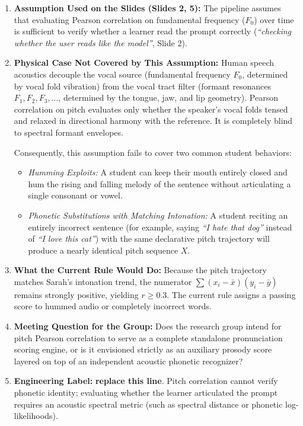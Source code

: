 \documentclass[11pt,a4paper]{article}
\begin{document}
\begin{enumerate}
    \item \textbf{Assumption Used on the Slides (Slides 2, 5):} The pipeline assumes that evaluating Pearson correlation on fundamental frequency ($F_0$) over time is sufficient to verify whether a learner read the prompt correctly (\textit{``checking whether the user reads like the model''}, Slide 2).
    \item \textbf{Physical Case Not Covered by This Assumption:} Human speech acoustics decouple the vocal source (fundamental frequency $F_0$, determined by vocal fold vibration) from the vocal tract filter (formant resonances $F_1, F_2, F_3, \dots$, determined by the tongue, jaw, and lip geometry). Pearson correlation on pitch evaluates only whether the speaker's vocal folds tensed and relaxed in directional harmony with the reference. It is completely blind to spectral formant envelopes. 
    
    Consequently, this assumption fails to cover two common student behaviors:
    \begin{itemize}
        \item \textit{Humming Exploits:} A student can keep their mouth entirely closed and hum the rising and falling melody of the sentence without articulating a single consonant or vowel.
        \item \textit{Phonetic Substitutions with Matching Intonation:} A student reciting an entirely incorrect sentence (for example, saying \textit{``I hate that dog''} instead of \textit{``I love this cat''}) with the same declarative pitch trajectory will produce a nearly identical pitch sequence $X$.
    \end{itemize}
    \item \textbf{What the Current Rule Would Do:} Because the pitch trajectory matches Sarah's intonation trend, the numerator $\sum (x_i - \bar{x})(y_i - \bar{y})$ remains strongly positive, yielding $r \ge 0.3$. The current rule assigns a passing score to hummed audio or completely incorrect words.
    \item \textbf{Meeting Question for the Group:} Does the research group intend for pitch Pearson correlation to serve as a complete standalone pronunciation scoring engine, or is it envisioned strictly as an auxiliary prosody score layered on top of an independent acoustic phonetic recognizer?
    \item \textbf{Engineering Label:} \textbf{replace this line}. Pitch correlation cannot verify phonetic identity; evaluating whether the learner articulated the prompt requires an acoustic spectral metric (such as spectral distance or phonetic log-likelihoods).
\end{enumerate}
\end{document}
